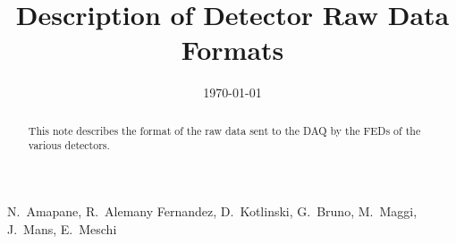 \documentclass[a4paper]{cmspaper}
\newcommand{\pdfbookmark}[3][1]{}
\begin{document}
\begin{titlepage}

  \date{\today}

  \title{Description of Detector Raw Data Formats}
  \begin{Authlist}
    N.~Amapane,
    R.~Alemany Fernandez,
    D.~Kotlinski,
    G.~Bruno,
    M.~Maggi,
    J.~Mans,
    E.~Meschi


  \end{Authlist}

  \begin{abstract}
    \pdfbookmark[1]{Abstract}{Abstract}
    This note describes the format of the raw data sent to the DAQ by
    the FEDs of the various detectors.
  \end{abstract} 
  
\end{titlepage}

\setcounter{page}{2}

\linenumbers %

 
 


\graphicspath{{../../../EcalRawData/doc/tex/}}





%
 

 


\end{document}

